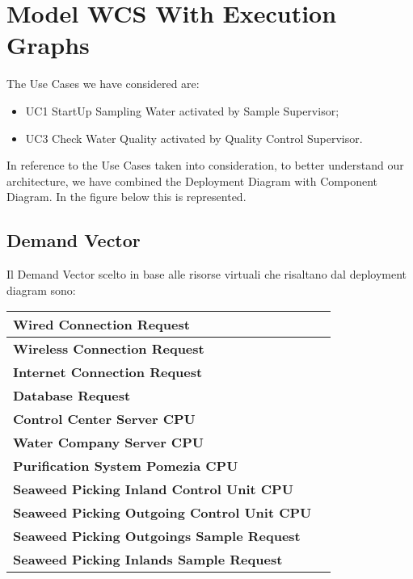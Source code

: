 \newpage \chapter{\textbf{Model WCS With Execution Graphs}}

The Use Cases we have considered are:
\begin{itemize}
\item UC1 StartUp Sampling Water activated by Sample Supervisor;
\item UC3 Check Water Quality activated by Quality Control Supervisor.
\end{itemize}
In reference to the Use Cases taken into consideration, to better understand our architecture, we have combined the Deployment Diagram with Component Diagram. In the figure below this is represented.

\begin{center}
\end{center}
\bigskip
{}

\newpage \section{Demand Vector}

Il Demand Vector scelto in base alle risorse virtuali che risaltano dal deployment diagram sono: 

\begin{longtable}{|p{4cm}|p{9cm}|}

\hline
\textbf{
Wired Connection Request} & \\

\hline
\textbf{Wireless Connection Request} & \\

\hline
\textbf{Internet Connection Request} & \\

\hline
\textbf{Database Request} & \\

\hline
\textbf{Control Center Server CPU} & \\

\hline
\textbf{Water Company Server CPU} & \\

\hline
\textbf{Purification System Pomezia CPU} & \\

\hline
\textbf{Seaweed Picking Inland Control Unit CPU} & \\

\hline
\textbf{Seaweed Picking Outgoing Control Unit CPU} & \\

\hline
\textbf{Seaweed Picking Outgoings Sample Request} & \\

\hline
\textbf{Seaweed Picking Inlands Sample Request} & \\

\hline
\end{longtable}

